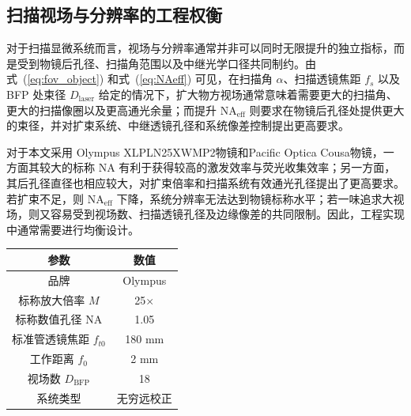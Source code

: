 


\subsection{扫描视场与分辨率的工程权衡}\label{2.4.4}

对于扫描显微系统而言，视场与分辨率通常并非可以同时无限提升的独立指标，而是受到物镜后孔径、扫描角范围以及中继光学口径共同制约。由式~(\ref{eq:fov_object}) 和式~(\ref{eq:NAeff}) 可见，在扫描角 $\alpha$、扫描透镜焦距 $f_s$ 以及 BFP 处束径 $D_{\mathrm{laser}}$ 给定的情况下，扩大物方视场通常意味着需要更大的扫描角、更大的扫描像圈以及更高通光余量；而提升 $\mathrm{NA}_{\mathrm{eff}}$ 则要求在物镜后孔径处提供更大的束径，并对扩束系统、中继透镜孔径和系统像差控制提出更高要求。

对于本文采用 Olympus XLPLN25XWMP2物镜和Pacific Optica Cousa物镜，一方面其较大的标称 NA 有利于获得较高的激发效率与荧光收集效率；另一方面，其后孔径直径也相应较大，对扩束倍率和扫描系统有效通光孔径提出了更高要求。若扩束不足，则 $\mathrm{NA}_{\mathrm{eff}}$ 下降，系统分辨率无法达到物镜标称水平；若一味追求大视场，则又容易受到视场数、扫描透镜孔径及边缘像差的共同限制。因此，工程实现中通常需要进行均衡设计。

\begin{table}[htbp]
\label{tab:olympus_obj}
\centering
\begin{tabular}{|c|c|}
\hline
参数 & 数值 \\ \hline
品牌 & Olympus \\ \hline
标称放大倍率 $M$ & 25$\times$ \\ \hline
标称数值孔径 NA & 1.05 \\ \hline
标准管透镜焦距 $f_{t0}$ & 180 mm \\ \hline
工作距离 $f_0$ & 2 mm \\ \hline
视场数 $D_{\mathrm{BFP}}$ & 18 \\ \hline
系统类型 & 无穷远校正 \\ \hline
\end{tabular}
\end{table}

